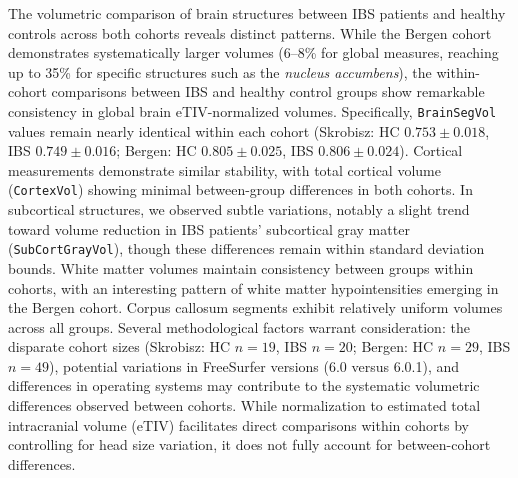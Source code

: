\documentclass[diagnostics,article,accept,pdftex,moreauthors]{Definitions/mdpi}
\begin{document}
\begin{table}[H]
\begin{tabular}{lcccccccc}
\end{tabular}


\end{table}



The volumetric comparison of brain structures between IBS patients and healthy controls across both cohorts reveals distinct patterns. While the Bergen cohort demonstrates systematically larger volumes (6--8\% for global measures, reaching up to 35\% for specific structures such as the \textit{nucleus accumbens}), the within-cohort comparisons between IBS and healthy control groups show remarkable consistency in global brain eTIV-normalized volumes. Specifically, \texttt{BrainSegVol} values remain nearly identical within each cohort (Skrobisz: HC $0.753 \pm 0.018$, IBS $0.749 \pm 0.016$; Bergen: HC $0.805 \pm 0.025$, IBS $0.806 \pm 0.024$). Cortical measurements demonstrate similar stability, with total cortical volume (\texttt{CortexVol}) showing minimal between-group differences in both cohorts. In subcortical structures, we observed subtle variations, notably a slight trend toward volume reduction in IBS patients' subcortical gray matter (\texttt{SubCortGrayVol}), though these differences remain within standard deviation bounds. White matter volumes maintain consistency between groups within cohorts, with an interesting pattern of white matter hypointensities emerging in the Bergen cohort. Corpus callosum segments exhibit relatively uniform volumes across all groups. Several methodological factors warrant consideration: the disparate cohort sizes (Skrobisz: HC $n=19$, IBS $n=20$; Bergen: HC $n=29$, IBS $n=49$), potential variations in FreeSurfer versions (6.0 versus 6.0.1), and differences in operating systems may contribute to the systematic volumetric differences observed between cohorts. While normalization to estimated total intracranial volume (eTIV) facilitates direct comparisons within cohorts by controlling for head size variation, it does not fully account for between-cohort differences.
\end{document}
